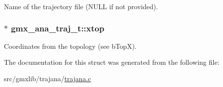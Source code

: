 \-Name of the trajectory file (\-N\-U\-L\-L if not provided). \hypertarget{structgmx__ana__traj__t_a451264a172bf813c2e3944a2da851005}{
\subsubsection[{xtop}]{$\ast$ {\bf gmx\-\_\-ana\-\_\-traj\-\_\-t\-::xtop}}}\label{structgmx__ana__traj__t_a451264a172bf813c2e3944a2da851005}
\-Coordinates from the topology (see {\ttfamily b\-Top\-X}). 

\-The documentation for this struct was generated from the following file\-:\begin{DoxyCompactItemize}
\item 
src/gmxlib/trajana/\hyperlink{trajana_8c}{trajana.\-c}\end{DoxyCompactItemize}
